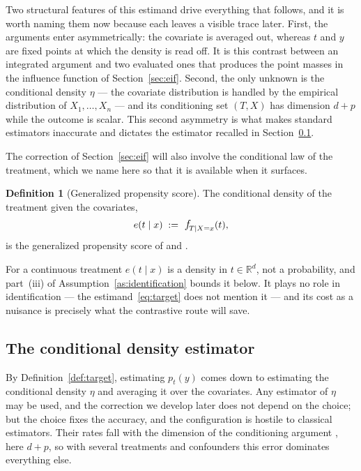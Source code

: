 \documentclass[11pt]{article}
\theoremstyle{plain}
\theoremstyle{definition}
\newtheorem{mydef}{Definition}
\theoremstyle{remark}
\newcommand{\R}{\mathbb{R}}
\newcommand{\pf}[1]{\ensuremath{\,\mathlarger{\textit{f}}_{#1}}}
\newcommand{\gps}{e}
\begin{document}
Two structural features of this estimand drive everything that follows, and it is worth
naming them now because each leaves a visible trace later. First, the arguments enter
asymmetrically: the covariate is averaged out, whereas $t$ and $y$ are fixed points at which
the density is read off. It is this contrast between an integrated argument and two evaluated
ones that produces the point masses in the influence function of Section~\ref{sec:eif}.
Second, the only unknown is the conditional density $\eta$ --- the covariate distribution is
handled by the empirical distribution of $X_1,\dots,X_n$ --- and its conditioning set $(T,X)$
has dimension $d+p$ while the outcome is scalar. This second asymmetry is what makes standard
estimators inaccurate and dictates the estimator recalled in Section~\ref{sec:setting-mcd}.

The correction of Section~\ref{sec:eif} will also involve the conditional law of the
treatment, which we name here so that it is available when it surfaces.

\begin{mydef}[Generalized propensity score]
\label{def:gps}
The conditional density of the treatment given the covariates,
\begin{equation}
\gps(t \mid x) \;:=\; \pf{T \mid X=x}(t),
\label{eq:gps}
\end{equation}
is the generalized propensity score of \citet{imbens2000} and \citet{hirano2004}.
\end{mydef}

For a continuous treatment $\gps(t\mid x)$ is a density in $t \in \R^{d}$, not a probability,
and part~(iii) of Assumption~\ref{as:identification} bounds it below. It plays no role in
identification --- the estimand~\eqref{eq:target} does not mention it --- and its cost as a
nuisance is precisely what the contrastive route will save.

\subsection{The conditional density estimator}
\label{sec:setting-mcd}

By Definition~\ref{def:target}, estimating $p_t(y)$ comes down to estimating the conditional
density $\eta$ and averaging it over the covariates. Any estimator of $\eta$ may be used, and
the correction we develop later does not depend on the choice; but the choice fixes the
accuracy, and the configuration is hostile to classical estimators. Their rates fall with the
dimension of the conditioning argument
\citep{stone1980,Tsybakov2009NonparametricEstimation,bashtannyk2001,hall2004}, here $d+p$, so
with several treatments and confounders this error dominates everything else.
\end{document}
